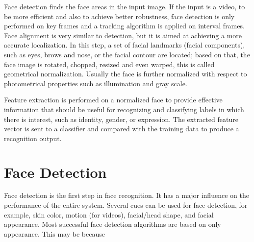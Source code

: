 \documentclass[12pt, twoside]{report}
\begin{document}
	Face detection finds the face areas in the input image. If the input is a video, to be more efficient and also to achieve better robustness, face detection is only performed on key frames and a tracking algorithm is applied on interval frames. Face alignment is very similar to detection, but it is aimed at achieving a more accurate localization. In this step, a set of facial landmarks (facial components), such as eyes, brows and nose, or the facial contour are located; based on that, the face image is rotated, chopped, resized and even warped, this is called geometrical normalization. Usually the face is further normalized with respect to photometrical properties such as illumination and gray scale.

	Feature extraction is performed on a normalized face to provide effective information that should be useful for recognizing and classifying labels in which there is interest, such as identity, gender, or expression. The extracted feature vector is sent to a classifier and compared with the training data to produce a recognition output.

	\section{Face Detection}
	Face detection is the first step in face recognition. It has a major influence on the performance of the entire system. Several cues can be used for face detection, for example, skin color, motion (for videos), facial/head shape, and facial appearance. Most successful face detection algorithms are based on only appearance. This may be because

	\newpage
	
\end{document}
